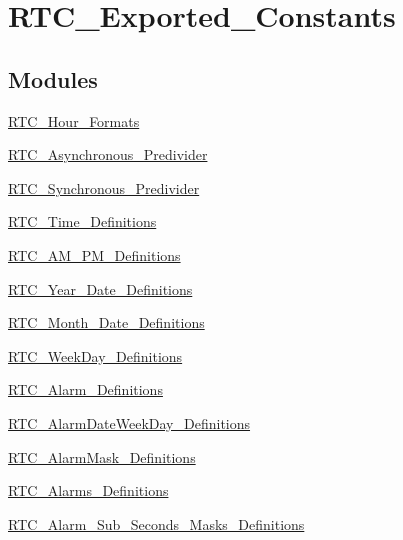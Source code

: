 \hypertarget{group___r_t_c___exported___constants}{}\section{R\+T\+C\+\_\+\+Exported\+\_\+\+Constants}
\label{group___r_t_c___exported___constants}
\subsection*{Modules}
\begin{DoxyCompactItemize}
\item 
\hyperlink{group___r_t_c___hour___formats}{R\+T\+C\+\_\+\+Hour\+\_\+\+Formats}
\item 
\hyperlink{group___r_t_c___asynchronous___predivider}{R\+T\+C\+\_\+\+Asynchronous\+\_\+\+Predivider}
\item 
\hyperlink{group___r_t_c___synchronous___predivider}{R\+T\+C\+\_\+\+Synchronous\+\_\+\+Predivider}
\item 
\hyperlink{group___r_t_c___time___definitions}{R\+T\+C\+\_\+\+Time\+\_\+\+Definitions}
\item 
\hyperlink{group___r_t_c___a_m___p_m___definitions}{R\+T\+C\+\_\+\+A\+M\+\_\+\+P\+M\+\_\+\+Definitions}
\item 
\hyperlink{group___r_t_c___year___date___definitions}{R\+T\+C\+\_\+\+Year\+\_\+\+Date\+\_\+\+Definitions}
\item 
\hyperlink{group___r_t_c___month___date___definitions}{R\+T\+C\+\_\+\+Month\+\_\+\+Date\+\_\+\+Definitions}
\item 
\hyperlink{group___r_t_c___week_day___definitions}{R\+T\+C\+\_\+\+Week\+Day\+\_\+\+Definitions}
\item 
\hyperlink{group___r_t_c___alarm___definitions}{R\+T\+C\+\_\+\+Alarm\+\_\+\+Definitions}
\item 
\hyperlink{group___r_t_c___alarm_date_week_day___definitions}{R\+T\+C\+\_\+\+Alarm\+Date\+Week\+Day\+\_\+\+Definitions}
\item 
\hyperlink{group___r_t_c___alarm_mask___definitions}{R\+T\+C\+\_\+\+Alarm\+Mask\+\_\+\+Definitions}
\item 
\hyperlink{group___r_t_c___alarms___definitions}{R\+T\+C\+\_\+\+Alarms\+\_\+\+Definitions}
\item 
\hyperlink{group___r_t_c___alarm___sub___seconds___masks___definitions}{R\+T\+C\+\_\+\+Alarm\+\_\+\+Sub\+\_\+\+Seconds\+\_\+\+Masks\+\_\+\+Definitions}
\item 

\end{DoxyCompactItemize}
